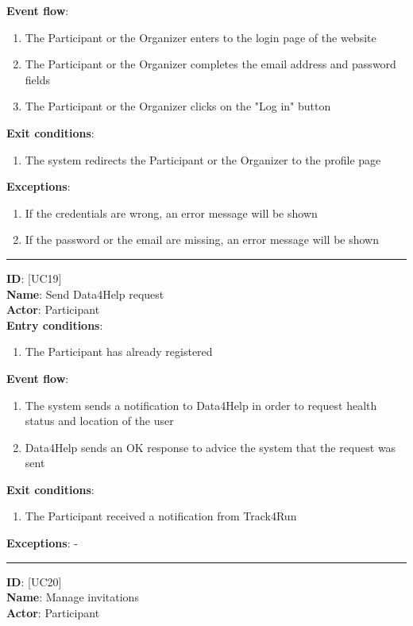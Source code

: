 \documentclass[hidelinks, 12pt]{report}
\newcommand\usecase[1]{ [UC#1] }
\begin{document}
\begin{itemize}
		\textbf{Event flow}:
		\begin{enumerate}
			\item{The Participant or the Organizer enters to the login page of the website}
			\item{The Participant or the Organizer completes the email address and password fields}
			\item{The Participant or the Organizer clicks on the "Log in" button}
		\end{enumerate}
		\textbf{Exit conditions}:
		\begin{enumerate}
			\item{The system redirects the Participant or the Organizer to the profile page}
		\end{enumerate}
		\textbf{Exceptions}:
		\begin{enumerate}
			\item{If the credentials are wrong, an error message will be shown}
			\item{If the password or the email are missing, an error message will be shown}
		\end{enumerate}
		\rule{\linewidth}{0.4pt}
		\textbf{ID}: \usecase{19} \\
		\textbf{Name}: Send Data4Help request \\
		\textbf{Actor}: Participant \\
		\textbf{Entry conditions}:
		\begin{enumerate}
			\item{The Participant has already registered}
		\end{enumerate}
		\textbf{Event flow}:
		\begin{enumerate}
			\item{The system sends a notification to Data4Help in order to request health status and location of the user}
			\item{Data4Help sends an OK response to advice the system that the request was sent}
		\end{enumerate}
		\textbf{Exit conditions}:
		\begin{enumerate}
			\item{The Participant received a notification from Track4Run}
		\end{enumerate}
		\textbf{Exceptions}: - \\
		\rule{\linewidth}{0.4pt}
		\textbf{ID}: \usecase{20} \\
		\textbf{Name}: Manage invitations \\
		\textbf{Actor}: Participant \\

\end{itemize}
\end{document}
